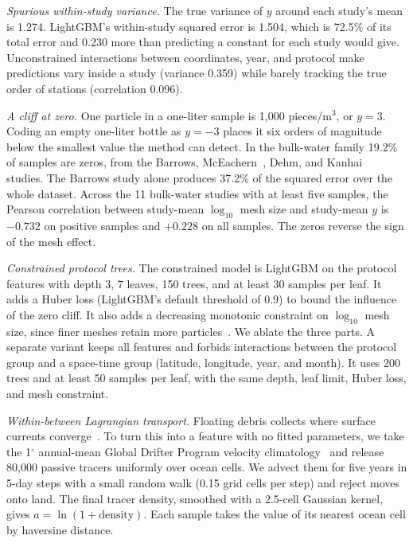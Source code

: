 \documentclass[12pt,a4paper]{report}
\begin{document}
\emph{Spurious within-study variance.} The true variance of $y$ around each study's mean is 1.274. LightGBM's within-study squared error is 1.504, which is 72.5\% of its total error and 0.230 more than predicting a constant for each study would give. Unconstrained interactions between coordinates, year, and protocol make predictions vary inside a study (variance 0.359) while barely tracking the true order of stations (correlation 0.096).

\emph{A cliff at zero.} One particle in a one-liter sample is 1,000 pieces/m$^3$, or $y=3$. Coding an empty one-liter bottle as $y=-3$ places it six orders of magnitude below the smallest value the method can detect. In the bulk-water family 19.2\% of samples are zeros, from the Barrows, McEachern~\cite{mceachern2019}, Dehm, and Kanhai~\cite{kanhai2018} studies. The Barrows study alone produces 37.2\% of the squared error over the whole dataset. Across the 11 bulk-water studies with at least five samples, the Pearson correlation between study-mean $\log_{10}$ mesh size and study-mean $y$ is $-0.732$ on positive samples and $+0.228$ on all samples. The zeros reverse the sign of the mesh effect.

\emph{Constrained protocol trees.} The constrained model is LightGBM on the protocol features with depth 3, 7 leaves, 150 trees, and at least 30 samples per leaf. It adds a Huber loss (LightGBM's default threshold of 0.9) to bound the influence of the zero cliff. It also adds a decreasing monotonic constraint on $\log_{10}$ mesh size, since finer meshes retain more particles~\cite{lindeque2020,tokai2021}. We ablate the three parts. A separate variant keeps all features and forbids interactions between the protocol group and a space-time group (latitude, longitude, year, and month). It uses 200 trees and at least 50 samples per leaf, with the same depth, leaf limit, Huber loss, and mesh constraint.

\emph{Within-between Lagrangian transport.} Floating debris collects where surface currents converge~\cite{maximenko2012}. To turn this into a feature with no fitted parameters, we take the 1$^\circ$ annual-mean Global Drifter Program velocity climatology~\cite{laurindo2017} and release 80,000 passive tracers uniformly over ocean cells. We advect them for five years in 5-day steps with a small random walk (0.15 grid cells per step) and reject moves onto land. The final tracer density, smoothed with a 2.5-cell Gaussian kernel, gives $a=\ln(1+\text{density})$. Each sample takes the value of its nearest ocean cell by haversine distance.
\end{document}
